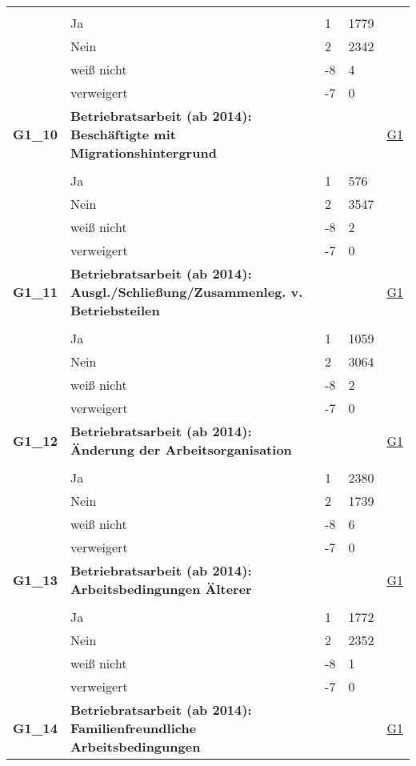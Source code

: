 \begin{longtable}{| L{2.5cm} | L{8.25cm}| C{1.5cm} | R{1.25cm} | C{2.25cm} |  }
   &  &  &  &  \\ 
   & Ja & 1 & 1779 &  \\ 
   & Nein & 2 & 2342 &  \\ 
   & weiß nicht & -8 & 4 &  \\ 
   & verweigert & -7 & 0 &  \\ 
   \midrule
\textbf{G1\_10}\label{var:suf:G1:10} & \textbf{Betriebratsarbeit (ab 2014): Beschäftigte mit Migrationshintergrund} &  &  & \hyperref[G1]{G1} \\ 
   &  &  &  &  \\ 
   & Ja & 1 & 576 &  \\ 
   & Nein & 2 & 3547 &  \\ 
   & weiß nicht & -8 & 2 &  \\ 
   & verweigert & -7 & 0 &  \\ 
   \midrule
\textbf{G1\_11}\label{var:suf:G1:11} & \textbf{Betriebratsarbeit (ab 2014): Ausgl./Schließung/Zusammenleg. v. Betriebsteilen} &  &  & \hyperref[G1]{G1} \\ 
   &  &  &  &  \\ 
   & Ja & 1 & 1059 &  \\ 
   & Nein & 2 & 3064 &  \\ 
   & weiß nicht & -8 & 2 &  \\ 
   & verweigert & -7 & 0 &  \\ 
   \midrule
\textbf{G1\_12}\label{var:suf:G1:12} & \textbf{Betriebratsarbeit (ab 2014): Änderung der Arbeitsorganisation} &  &  & \hyperref[G1]{G1} \\ 
   &  &  &  &  \\ 
   & Ja & 1 & 2380 &  \\ 
   & Nein & 2 & 1739 &  \\ 
   & weiß nicht & -8 & 6 &  \\ 
   & verweigert & -7 & 0 &  \\ 
   \midrule
\textbf{G1\_13}\label{var:suf:G1:13} & \textbf{Betriebratsarbeit (ab 2014): Arbeitsbedingungen Älterer} &  &  & \hyperref[G1]{G1} \\ 
   &  &  &  &  \\ 
   & Ja & 1 & 1772 &  \\ 
   & Nein & 2 & 2352 &  \\ 
   & weiß nicht & -8 & 1 &  \\ 
   & verweigert & -7 & 0 &  \\ 
   \midrule
\textbf{G1\_14}\label{var:suf:G1:14} & \textbf{Betriebratsarbeit (ab 2014): Familienfreundliche Arbeitsbedingungen} &  &  & \hyperref[G1]{G1} \\ 

\end{longtable}
